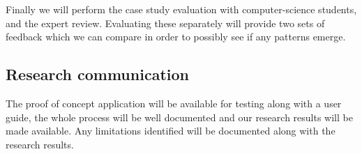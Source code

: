 Finally we will perform the case study evaluation with computer-science students, and the expert review. Evaluating these separately will provide two sets of feedback which we can compare in order to possibly see if any patterns emerge. 

\subsection{Research communication}
The proof of concept application will be available for testing along with a user guide, the whole process will be well documented and our research results will be made available.
Any limitations identified  will be documented along with the research results. 



